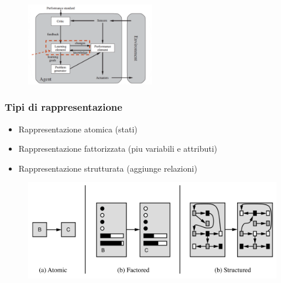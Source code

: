\begin{figure}[H]
	\centering
	\includegraphics[width=0.5\textwidth]{immagini/Agente_apprende.png}
\end{figure}

\subsubsection{Tipi di rappresentazione}

\begin{itemize}
	\item Rappresentazione atomica (stati)
	\item Rappresentazione fattorizzata (piu variabili e attributi)
	\item Rappresentazione strutturata (aggiunge relazioni)
\end{itemize}

\begin{figure}[H]
	\centering
	\includegraphics[width=\textwidth]{immagini/Tipi_rappresentazione.png}
\end{figure}
